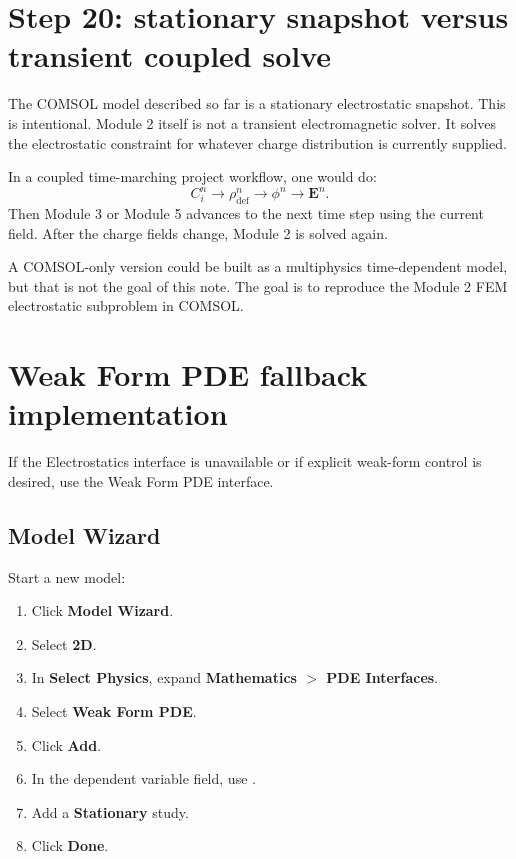 \documentclass[11pt]{article}
\newcommand{\Evec}{\mathbf{E}}
\newcommand{\code}[1]{\texttt{\detokenize{#1}}}
\begin{document}
\section{Step 20: stationary snapshot versus transient coupled solve}

The COMSOL model described so far is a stationary electrostatic snapshot. This is intentional. Module 2 itself is not a transient electromagnetic solver. It solves the electrostatic constraint for whatever charge distribution is currently supplied.

In a coupled time-marching project workflow, one would do:
\begin{equation}
C_i^n \rightarrow \rho_{\mathrm{def}}^n \rightarrow \phi^n \rightarrow \Evec^n.
\end{equation}
Then Module 3 or Module 5 advances to the next time step using the current field. After the charge fields change, Module 2 is solved again.

A COMSOL-only version could be built as a multiphysics time-dependent model, but that is not the goal of this note. The goal is to reproduce the Module 2 FEM electrostatic subproblem in COMSOL.

\section{Weak Form PDE fallback implementation}

If the Electrostatics interface is unavailable or if explicit weak-form control is desired, use the Weak Form PDE interface.

\subsection{Model Wizard}

Start a new model:
\begin{enumerate}[leftmargin=2em]
\item Click \textbf{Model Wizard}.
\item Select \textbf{2D}.
\item In \textbf{Select Physics}, expand \textbf{Mathematics $>$ PDE Interfaces}.
\item Select \textbf{Weak Form PDE}.
\item Click \textbf{Add}.
\item In the dependent variable field, use \code{V}.
\item Add a \textbf{Stationary} study.
\item Click \textbf{Done}.
\end{enumerate}
\end{document}

